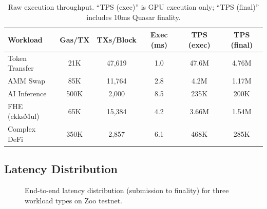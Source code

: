 \begin{table}[t]
\centering
\begin{tabular}{lccccc}
\toprule
\textbf{Workload} & \textbf{Gas/TX} & \textbf{TXs/Block} & \textbf{Exec (ms)} & \textbf{TPS (exec)} & \textbf{TPS (final)} \\
\midrule
Token Transfer & 21K & 47,619 & 1.0 & 47.6M & 4.76M \\
AMM Swap & 85K & 11,764 & 2.8 & 4.2M & 1.17M \\
AI Inference & 500K & 2,000 & 8.5 & 235K & 200K \\
FHE (ckksMul) & 65K & 15,384 & 4.2 & 3.66M & 1.54M \\
Complex DeFi & 350K & 2,857 & 6.1 & 468K & 285K \\
\bottomrule
\end{tabular}
\caption{Raw execution throughput. ``TPS (exec)'' is GPU execution only; ``TPS (final)'' includes 10ms Quasar finality.}
\label{tab:throughput}
\end{table}

\subsection{Latency Distribution}

\begin{figure}[t]
\centering
{}
\caption{End-to-end latency distribution (submission to finality) for three workload types on Zoo testnet.}
\label{fig:latency}
\end{figure}


